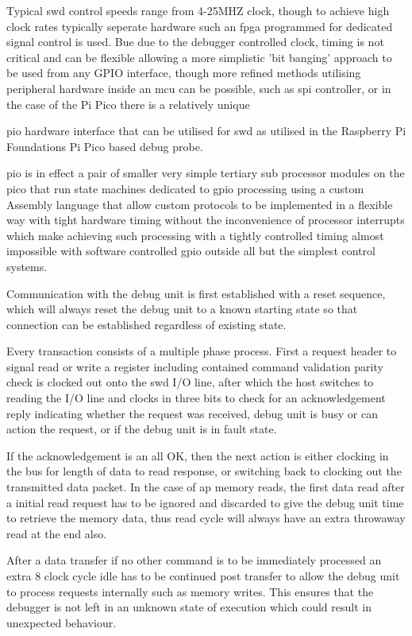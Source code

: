 Typical \gls{swd} control speeds range from 4-25MHZ clock, though to achieve high clock rates typically seperate hardware such an \gls{fpga} programmed for dedicated signal control is used. Bue due to the debugger controlled clock, timing is not critical and can be flexible allowing a more simplistic 'bit banging' approach to be used from any GPIO interface, though more refined methods utilising peripheral hardware inside an \gls{mcu} can be possible, such as \gls{spi} controller, or in the case of the Pi Pico there is a relatively unique {\gls{pio} hardware interface that can be utilised for \gls{swd} as utilised in the Raspberry Pi Foundations Pi Pico based debug probe.

\gls{pio} is in effect a pair of smaller very simple tertiary sub processor modules on the pico that run state machines dedicated to \gls{gpio} processing using a custom Assembly language that allow custom protocols to be implemented in a flexible way with tight hardware timing without the inconvenience of processor interrupts which make achieving such processing with a tightly controlled timing almost impossible with software controlled \gls{gpio} outside all but the simplest control systems.


Communication with the debug unit is first established with a reset sequence, which will always reset the debug unit to a known starting state so that connection can be established regardless of existing state.

Every transaction consists of a multiple phase process. First a request header to signal read or write a register including contained command validation parity check is clocked out onto the \gls{swd} I/O line, after which the host switches to reading the I/O line and clocks in three bits to check for an acknowledgement reply indicating whether the request was received, debug unit is busy or can action the request, or if the debug unit is in fault state.

If the acknowledgement is an all OK, then the next action is either clocking in the bus for length of data to read response, or switching back to clocking out the transmitted data packet. In the case of \gls{ap} memory reads, the first data read after a initial read request has to be ignored and discarded to give the debug unit time to retrieve the memory data, thus read cycle will always have an extra throwaway read at the end also.

After a data transfer if no other command is to be immediately processed an extra 8 clock cycle idle has to be continued post transfer to allow the debug unit to process requests internally such as memory writes. This ensures that the debugger is not left in an unknown state of execution which could result in unexpected behaviour.

}
